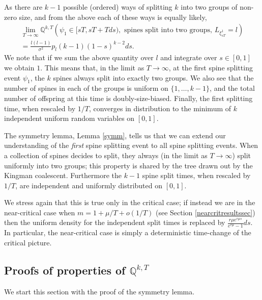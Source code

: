 \documentclass{article}
\theoremstyle{plain}
\theoremstyle{definition}
\newcommand{\Q}{\mathbb{Q}}
\begin{document}
As there are $k-1$ possible (ordered) ways of splitting $k$ into two groups of non-zero size, and from the above each of these ways is equally likely,
\begin{multline*}
\lim_{T\to\infty}\Q^{k,T} \left( \psi_1 \in [sT, sT+Tds), \text{ spines split into two groups},\, L_{\xi^1_{sT}} = l \right)\\
= \frac{l(l-1)}{\sigma^2}p_l (k-1)(1-s)^{k-2}ds.
\end{multline*}
We note that if we sum the above quantity over $l$ and integrate over $s\in[0,1]$ we obtain $1$. This means that, in the limit as $T\to\infty$, at the first spine splitting event $\psi_1$, the $k$ spines always split into exactly two groups. We also see that the number of spines in each of the groups is uniform on $\{1,\ldots,k-1\}$, and the total number of offspring at this time is doubly-size-biased. Finally, the first splitting time, when rescaled by $1/T$, converges in distribution to the minimum of $k$ independent uniform random variables on $[0,1]$.

The symmetry lemma, Lemma \ref{symm}, tells us that we can extend our understanding of the \emph{first} spine splitting event to all spine splitting events. When a collection of spines decides to split, they always (in the limit as $T\to\infty$) split uniformly into two groups; this property is shared by the tree drawn out by the Kingman coalescent. Furthermore the $k-1$ spine split times, when rescaled by $1/T$, are independent and uniformly distributed on $[0,1]$.

We stress again that this is true only in the critical case; if instead we are in the near-critical case when $m=1+\mu/T+o(1/T)$ (see Section \ref{nearcritresultssec}) then the uniform density for the independent split times is replaced by $\frac{r\mu e^{r\mu s}}{e^{r\mu}-1}ds$. In particular, the near-critical case is simply a deterministic time-change of the critical picture.


\subsection{Proofs of properties of $\Q^{k,T}$}\label{Qproofsec}

We start this section with the proof of the symmetry lemma.
\end{document}
